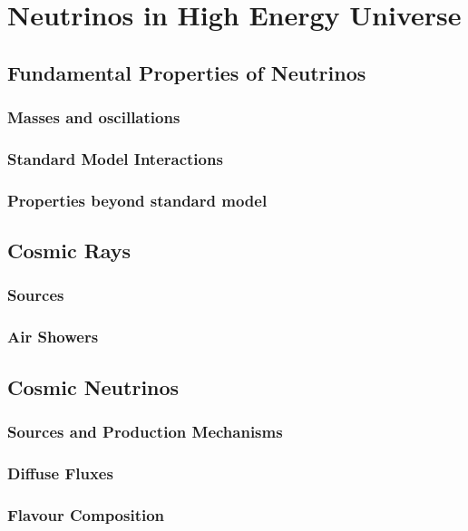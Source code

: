 \chapter{Neutrinos in High Energy Universe}

\section{Fundamental Properties of Neutrinos}
\label{sec:nu_properties}
\subsection{Masses and oscillations}

\subsection{Standard Model Interactions}

\subsection{Properties beyond standard model}



\section{Cosmic Rays}

\label{sec:cosmic_rays}

\subsection{Sources}

\subsection{Air Showers}


\section{Cosmic Neutrinos}
\label{sec:cosmic_nu}

\subsection{Sources and Production Mechanisms}

\subsection{Diffuse Fluxes}

\subsection{Flavour Composition}



